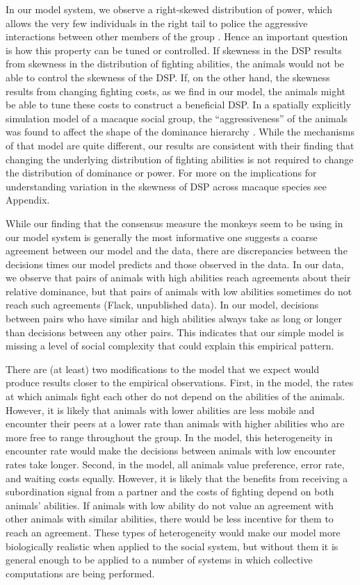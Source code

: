 \documentclass{pnastwo}
\begin{document}
\begin{article}
In our model system, we observe a right-skewed distribution of power, which allows the very few individuals in the right tail to police the aggressive interactions between other members of the group \cite{Brush:2013fk,Flack:2006uq,Flack:2006fk}. Hence an important question is how this property can be tuned or controlled. If skewness in the DSP results from skewness in the distribution of fighting abilities, the animals would not be able to control the skewness of the DSP. If, on the other hand, the skewness results from changing fighting costs, as we find in our model, the animals might be able to tune these costs to construct a beneficial DSP. In a spatially explicitly simulation model of a macaque social group, the ``aggressiveness'' of the animals was found to affect the shape of the dominance hierarchy \cite{Hemelrijk:2011fk}.  While the mechanisms of that model are quite different, our results are consistent with their finding that changing the underlying distribution of fighting abilities is not required to change the distribution of dominance or power. For more on the implications for understanding variation in the skewness  of DSP across macaque species see Appendix.

While our finding that the consensus measure the monkeys seem to be using in our model system is generally the most informative one suggests a coarse agreement between our model and the data, there are discrepancies between the decisions times our model predicts and those observed in the data.  In our data, we observe that pairs of animals with high abilities reach agreements about their relative dominance, but that pairs of animals with low abilities sometimes do not reach such agreements (Flack, unpublished data).  In our model, decisions between pairs who have similar and high abilities always  take as long or longer than decisions between any other pairs.  This indicates that our simple model is missing a level of social complexity that could explain this empirical pattern.  

There are (at least) two modifications to the model that we expect would produce results closer to the empirical observations.  First, in the model, the rates at which animals fight each other do not depend on the abilities of the animals.  However, it is likely that animals with lower abilities are less mobile and encounter their peers at a lower rate than animals with higher abilities who are more free to range throughout the group.  In the model, this heterogeneity in encounter rate would make the decisions between animals with low encounter rates take longer.  Second, in the model, all animals value preference, error rate, and waiting costs equally.  However, it is likely that the benefits from receiving a subordination signal from a partner and the costs of fighting depend on both animals' abilities.  If animals with low ability  do not value an agreement with other animals with similar abilities, there would be less incentive for them to reach an agreement.  These types of heterogeneity would make our model more biologically realistic when applied to the social system, but without them it is general enough to be applied to a number of systems in which collective computations are being performed.  


\end{article}
\end{document}
